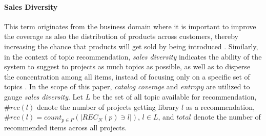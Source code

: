 \paragraph{\textbf{Sales Diversity}} This term originates from the business domain where it is important to 
improve the coverage as also the distribution of products across customers, thereby increasing the 
chance that products will get sold by being introduced 
\cite{Vargas_sales_diversity_14}. Similarly, in the context 
of topic recommendation, \emph{sales diversity} indicates the ability of the system to suggest to 
projects as much topics as possible, as well as to disperse the concentration among all items, 
instead of focusing only on a specific set of topics \cite{Robillard:2014:RSS:2631387}. 
In the scope of this paper, \emph{catalog coverage} and \emph{entropy} are utilized to gauge 
\emph{sales diversity}. Let $L$ be the set of all 
topic available for recommendation, $\#rec(l)$ denote the number of projects getting library 
$l$ as a recommendation, \ie $\#rec(l)=count_{p \in P}( \left |   REC_{N}(p)  \ni l  \right |  )$, $l \in L $, and $total$ denote the number of recommended items across all projects.
%

